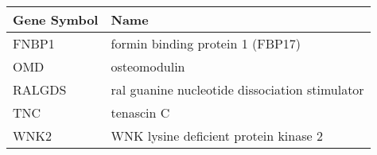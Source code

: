 \begin{tabular}{ll}
\toprule
Gene Symbol &                                           Name \\
\midrule
      FNBP1 &               formin binding protein 1 (FBP17) \\
        OMD &                                   osteomodulin \\
     RALGDS & ral guanine nucleotide dissociation stimulator \\
        TNC &                                     tenascin C \\
       WNK2 &          WNK lysine deficient protein kinase 2 \\
\bottomrule
\end{tabular}
